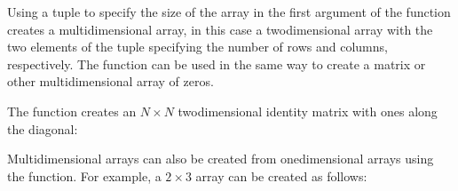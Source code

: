 \documentclass[letterpaper,10pt,english]{sphinxmanual}
\begin{document}
\sphinxAtStartPar
Using a tuple to specify the size of the array in the first argument of the  function creates a multidimensional array, in this case a two\sphinxhyphen{}dimensional array with the two elements of the tuple specifying the number of rows and columns, respectively.  The  function can be used in the same way to create a matrix or other multidimensional array of zeros.

\sphinxAtStartPar
The  function creates an \(N \times N\) two\sphinxhyphen{}dimensional identity matrix with ones along the diagonal:

\begin{sphinxVerbatim}[commandchars=\\\{\},numbers=left,firstnumber=1,stepnumber=1]
\PYG{p}{[}\PYG{p}{[}    \PYG{p}{]}
\PYG{g+go}{                [ 0., 0., 0., 1.]])}
\end{sphinxVerbatim}

\sphinxAtStartPar
Multidimensional arrays can also be created from one\sphinxhyphen{}dimensional arrays using the  function.  For example, a \(2 \times 3\) array can be created as follows:

\begin{sphinxVerbatim}[commandchars=\\\{\},numbers=left,firstnumber=1,stepnumber=1]
  

\PYG{p}{[}     \PYG{p}{]}

   

\PYG{p}{[}\PYG{p}{[}  \PYG{p}{]}
\PYG{g+go}{                [3, 4, 5]])}
\end{sphinxVerbatim}
\end{document}
